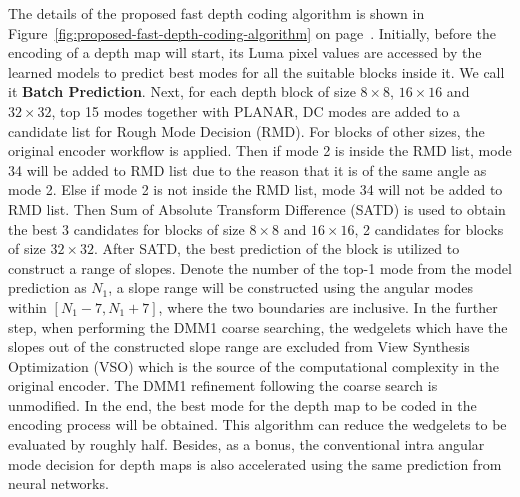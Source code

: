 The details of the proposed fast depth coding algorithm is shown 
in Figure~\ref{fig:proposed-fast-depth-coding-algorithm}
on page~\pageref{fig:proposed-fast-depth-coding-algorithm}.
Initially, before the encoding of a depth map will start, 
its Luma pixel values are accessed by the learned models to
predict best modes for all the suitable blocks inside it.
We call it \textbf{Batch Prediction}.
Next, for each depth block of 
size \(8\times8\), \(16\times16\) and \(32\times32\), 
top 15 modes together with PLANAR, DC modes are added to 
a candidate list for Rough Mode Decision (RMD).
For blocks of other sizes, the original encoder workflow
is applied.
Then if mode 2 is inside the RMD list, mode 34
will be added to RMD list due to the reason that
it is of the same angle as mode 2.
Else if mode 2 is not inside the RMD list, 
mode 34 will not be added to RMD list.
Then Sum of Absolute Transform Difference (SATD)
is used to obtain the best 3 candidates for blocks
of size \(8\times8\) and \(16\times16\), 2 candidates
for blocks of size \(32\times32\).
After SATD, the best prediction of the block
is utilized to construct a range of slopes.
Denote the number of the top-1 mode from the model 
prediction as \(N_1\), a slope range will be constructed 
using the angular modes within \([N_1-7, N_1+7]\), where
the two boundaries are inclusive.
In the further step, when performing the DMM1 coarse
searching, the wedgelets which have the slopes out of the 
constructed slope range are excluded from 
View Synthesis Optimization (VSO) which is the
source of the computational complexity in the original
encoder.
The DMM1 refinement following the coarse search is unmodified.
In the end, the best mode for the
depth map to be coded in the encoding process will
be obtained.
This algorithm can reduce the wedgelets to be evaluated by 
roughly half.
Besides, as a bonus, the conventional intra 
angular mode decision for depth maps is also
accelerated using the same prediction from 
neural networks.

